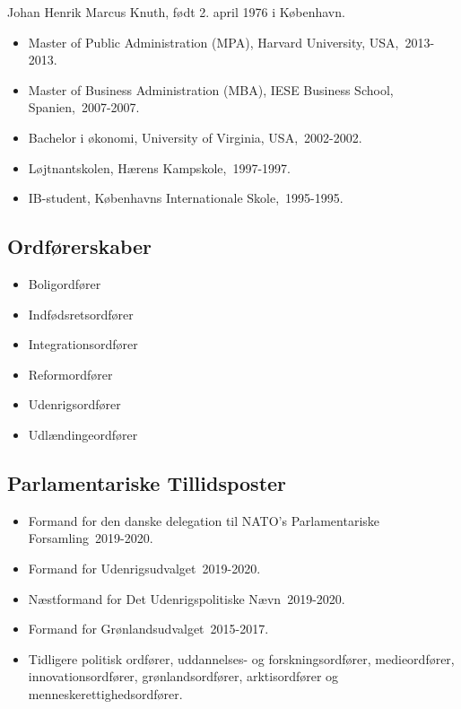 \documentclass[11pt, a4paper]{awesome-cv}
\begin{document}
\makecvheader[R]
\makelettertitle
\begin{cvletter}
Johan Henrik Marcus Knuth, født 2. april 1976 i København.

\begin{itemize}
\item Master of Public Administration (MPA), Harvard University, USA, 2013-2013.
\item Master of Business Administration (MBA), IESE Business School, Spanien, 2007-2007.
\item Bachelor i økonomi, University of Virginia, USA, 2002-2002.
\item Løjtnantskolen, Hærens Kampskole, 1997-1997.
\item IB-student, Københavns Internationale Skole, 1995-1995.
\end{itemize}
\subsection*{Ordførerskaber}
\begin{itemize}
\item Boligordfører
\item Indfødsretsordfører
\item Integrationsordfører
\item Reformordfører
\item Udenrigsordfører
\item Udlændingeordfører
\end{itemize}
\subsection*{Parlamentariske Tillidsposter}
\begin{itemize}
\item Formand for den danske delegation til NATO's Parlamentariske Forsamling 2019-2020.
\item Formand for Udenrigsudvalget 2019-2020.
\item Næstformand for Det Udenrigspolitiske Nævn 2019-2020.
\item Formand for Grønlandsudvalget 2015-2017.
\item Tidligere politisk ordfører, uddannelses- og forskningsordfører, medieordfører, innovationsordfører, grønlandsordfører, arktisordfører og menneskerettighedsordfører.
\end{itemize}

\end{cvletter}
\end{document}
